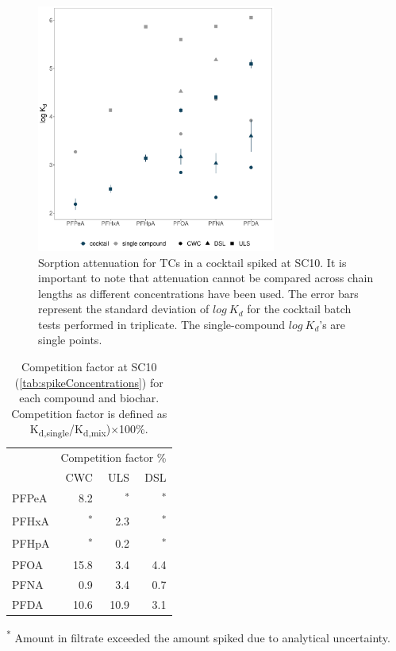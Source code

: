 \begin{figure}
    \centering
    \includegraphics[width=0.7\textwidth]{R/figs/C10_mixVsSingle_BC_plot.pdf}
    \caption{Sorption attenuation for TCs in a cocktail spiked at SC10. It is important to note that attenuation cannot be compared across chain lengths as different concentrations have been used. The error bars represent the standard deviation of $log~K_d$ for the cocktail batch tests performed in triplicate. The single-compound $log~K_d$'s are single points.}
    \label{fig:competition}
\end{figure}

\begin{table}
\centering
\caption{Competition factor at SC10 (\cref{tab:spikeConcentrations}) for each compound and biochar. Competition factor is defined as K\textsubscript{d,single}/K\textsubscript{d,mix})$\times$100\%.}
\begin{threeparttable}
\label{tab:competition}
\begin{tabular}{lrrr}
\toprule
 & \multicolumn{3}{c}{Competition factor \%} \\ \cmidrule(l){2-4}
 & CWC & ULS & DSL \\ \midrule
PFPeA & 8.2 & \textsuperscript{*} & \textsuperscript{*} \\
PFHxA & \textsuperscript{*} & 2.3 & \textsuperscript{*} \\
PFHpA & \textsuperscript{*} & 0.2 & \textsuperscript{*} \\
PFOA & 15.8 & 3.4 & 4.4 \\
PFNA & 0.9 & 3.4 & 0.7 \\
PFDA & 10.6 & 10.9 & 3.1 \\ \bottomrule
\end{tabular}
\begin{tablenotes}
\item \textsuperscript{*} Amount in filtrate exceeded the amount spiked due to analytical uncertainty.
\end{tablenotes}
\end{threeparttable}
\end{table}

